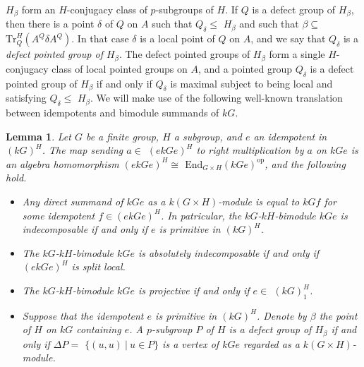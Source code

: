 \documentclass{amsart}
\theoremstyle{plain}\newtheorem{Theorem}{Theorem}[section]
\theoremstyle{plain}\newtheorem{Conjecture}[Theorem]{Conjecture}
\theoremstyle{plain}\newtheorem{Corollary}[Theorem]{Corollary}
\theoremstyle{plain}\newtheorem{Lemma}[Theorem]{Lemma}
\theoremstyle{plain}\newtheorem{Proposition}[Theorem]{Proposition}
\theoremstyle{definition}\newtheorem{Definition}[Theorem]{Definition}
\theoremstyle{definition}\newtheorem{Example}[Theorem]{Example}
\theoremstyle{definition}\newtheorem{Examples}[Theorem]{Examples}
\theoremstyle{definition}\newtheorem{Exercise}[Theorem]{Exercise}
\theoremstyle{definition}\newtheorem{Notation}[Theorem]{Notation}
\theoremstyle{definition}\newtheorem{Remark}[Theorem]{Remark}
\theoremstyle{definition}\newtheorem{Remarks}[Theorem]{Remarks}
\theoremstyle{plain}\newtheorem{Statement}[Theorem]{}
\def\End{\mathrm{End}}
\def\op{\mathrm{op}}
\def\Tr{\mathrm{Tr}}             \def\tenOT{\otimes_{\mathcal{O}T}}
\begin{document}
$H_\beta$ form an $H$-conjugacy class of $p$-subgroups of $H$. If $Q$ is a defect 
group of $H_\beta$, then there is a point $\delta$ of $Q$ on $A$ such that
$Q_\delta\leq$ $H_\beta$ and such that $\beta\subseteq$ $\Tr^H_Q(A^Q\delta A^Q)$.
In that case $\delta$ is a local point of $Q$ on $A$, and we say that $Q_\delta$ is
a {\em defect pointed group of $H_\beta$}. The defect pointed groups of $H_\beta$
form a single $H$-conjugacy class of local pointed groups on $A$, and a pointed
group $Q_\delta$ is a defect pointed group of $H_\beta$ if and only if
$Q_\delta$ is maximal subject to being local and satisfying $Q_\delta\leq$ $H_\beta$.
We will make use of the following well-known translation between idempotents
and bimodule summands of $kG$.

\begin{Lemma} \label{bimod-idempotent-Lemma}
Let $G$ be a finite group, $H$ a subgroup, and $e$ an idempotent in $(kG)^H$.
The map sending $a \in$ $(ekGe)^H$ to right multiplication by $a$ on $kGe$
is an algebra homomorphism $(ekGe)^H\cong$ $\End_{G\times H}(kGe)^\op$, 
and the following hold.
\begin{itemize}
\item[{\rm (i)}]
Any direct summand of $kGe $  as a  $k(G \times H)$-module  is  equal to $kGf $  
for some idempotent  $f\in (ekGe)^H $.
In patricular, the $kG$-$kH$-bimodule $kGe$ is indecomposable if and only if 
$e$ is primitive in  $(kG)^H$.
\item[{\rm (ii)}]
The $kG$-$kH$-bimodule $kGe$ is absolutely indecomposable if and only if 
$(ekGe)^H$ is  split local.
\item[{\rm (iii)}]
The $kG$-$kH$-bimodule $kGe$ is projective if and only if $e\in $ $(kG)^H_1$.
\item[{\rm (iv)}]
Suppose that the idempotent $e$ is primitive in $(kG)^H$. Denote by $\beta$ 
the point of $H$ on $kG$ containing $e$. A $p$-subgroup $P$ of $H$  is a defect group 
of $H_\beta$ if and only if $\Delta P=$ $\{(u,u)\ |\ u\in P\}$ is a vertex of $kGe$ 
regarded as a $k(G\times H)$-module. 
\end{itemize}
\end{Lemma}
\end{document}
